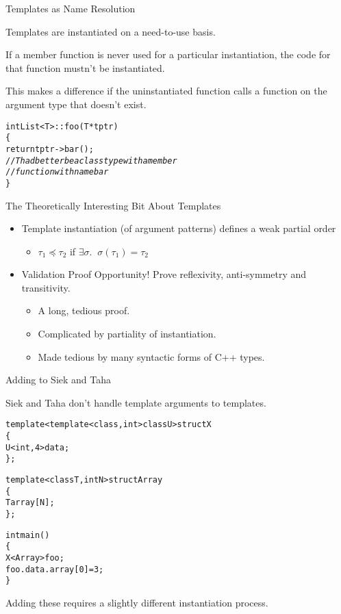 \documentclass[compress,dvips,color=usenames,xcolor=dvipsnames]{beamer}
\newcommand{\cpp}{\mbox{C\hspace{-.1em}+\hspace{-.05em}+}}
\newcommand{\structcol}{\usebeamercolor[fg]{structure}}
\begin{document}
\begin{frame}[containsverbatim]{Templates as Name Resolution}

  Templates are instantiated on a need-to-use basis.

  \bigskip
  If a member function is never used for a particular instantiation, the
  code for that function mustn't be instantiated.

  \bigskip
  This makes a difference if the uninstantiated function calls a
  function on the argument type that doesn't exist.
{\structcol
\begin{alltt}
   int List<T>::foo(T *tptr)
   \{
     return tptr->bar();
     {\magenta// \textit{T had better be a class type with a member}}
     {\magenta// \textit{function with name bar}}
   \}
\end{alltt}}

\end{frame}

\begin{frame}{The Theoretically Interesting Bit About Templates}

\begin{itemize}
\item Template instantiation (of argument patterns) defines a weak partial
  order
  \begin{itemize}
  \item $\tau_1 \preceq \tau_2$ if $\exists \sigma. \;\;\sigma(\tau_1) = \tau_2$
  \end{itemize}

\bigskip
\item Validation Proof Opportunity!  Prove reflexivity, anti-symmetry
  and transitivity.
\begin{itemize}
\item A long, tedious proof.
\item Complicated by partiality of
  instantiation.
\item Made tedious by many syntactic forms of \cpp{}
  types.
\end{itemize}
\end{itemize}
\end{frame}

\begin{frame}[containsverbatim]{Adding to Siek and Taha}

Siek and Taha don't handle template arguments to templates.

{\small\structcol
\begin{alltt}
  template <template <class, int> class U> struct X
  \{
    U<int,4> data;
  \};

  template <class T, int N> struct Array
  \{
    T array[N];
  \};

  int main()
  \{
    X<Array> foo;
    foo.data.array[0] = 3;
  \}
\end{alltt}}

\bigskip
Adding these requires a slightly different instantiation process.

\end{frame}
\end{document}
